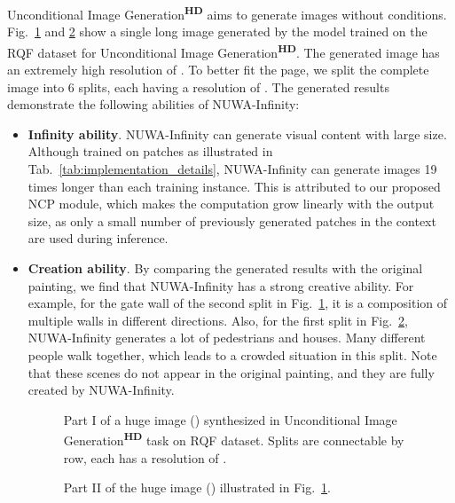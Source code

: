 \documentclass{article}
\begin{document}
Unconditional Image Generation\textsuperscript{\textbf{HD}} aims to generate images without conditions. Fig.~\ref{fig:uig1} and \ref{fig:uig2} show a single long image generated by the model trained on the RQF dataset for Unconditional Image Generation\textsuperscript{\textbf{HD}}. The generated image has an extremely high resolution of . To better fit the page, we split the complete image into 6 splits, each having a resolution of . The generated results demonstrate the following abilities of NUWA-Infinity: 
\begin{itemize}[leftmargin=*]

\item \textbf{Infinity ability}.  NUWA-Infinity can generate visual content with large size. Although trained on  patches as illustrated in Tab.~\ref{tab:implementation_details}, NUWA-Infinity can generate images 19 times longer than each training instance. This is attributed to our proposed NCP module, which makes the computation grow linearly with the output size, as only a small number of previously generated patches in the context are used during inference. 

\item \textbf{Creation ability}. By comparing the generated results with the original painting, we find that NUWA-Infinity has a strong creative ability. For example, for the gate wall of the second split in Fig.~\ref{fig:uig1}, it is a composition of multiple walls in different directions. Also, for the first split in Fig.~\ref{fig:uig2}, NUWA-Infinity generates a lot of pedestrians and houses. Many different people walk together, which leads to a crowded situation in this split. Note that these scenes do not appear in the original painting, and they are fully created by NUWA-Infinity.

\begin{figure}[h]
    \caption{Part I of a huge image () synthesized in Unconditional Image Generation\textsuperscript{\textbf{HD}} task on RQF dataset. Splits are connectable by row, each has a resolution of .}
    \label{fig:uig1}
\end{figure}


\begin{figure}[p]
 \vspace*{-2.3cm}
\caption{Part II of the huge image () illustrated in Fig.~\ref{fig:uig1}.}
    \label{fig:uig2}
\end{figure}




\end{itemize}
\end{document}
